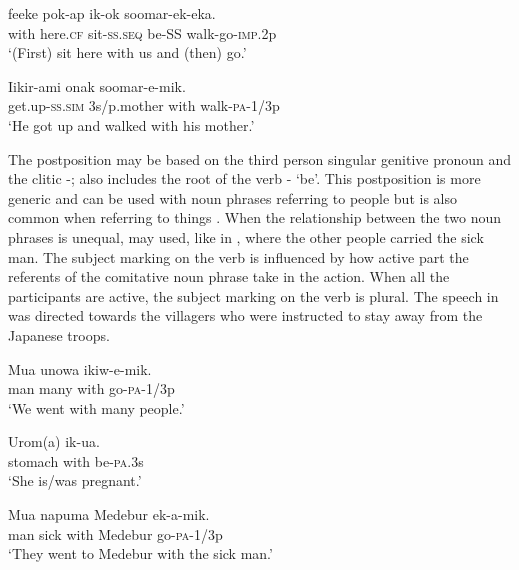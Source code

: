 \ea%
\label{ex:3:x822}
\gll {} feeke pok-ap ik-ok soomar-ek-eka. \\
with here.\textsc{cf} sit-\textsc{ss}.\textsc{seq} be-SS walk-go-\textsc{imp}.2p\\
\glt`(First) sit here with us and (then) go.'
\z

\ea%
\label{ex:3:x1817}
\gll Iikir-ami onak  soomar-e-mik. \\
get.up-\textsc{ss}.\textsc{sim} 3s/p.mother with walk-\textsc{pa}-1/3p\\
\glt`He got up and walked with his mother.'
\z

The postposition  may be based on the third person singular genitive pronoun  and the clitic -;  also includes the root of the verb \nobreakdash- `be'. This postposition is more generic and can be used with noun phrases referring to people  but is also common when referring to things . When the relationship between the two noun phrases is unequal,  may used, like in , where the other people carried the sick man. The subject marking on the verb is influenced by how active part the referents of the comitative noun phrase take in the action. When all the participants are active, the subject marking on the verb is plural. The speech in  was directed towards the villagers who were instructed to stay away from the Japanese troops. 

\ea%
\label{ex:3:x754}
\gll Mua unowa  ikiw-e-mik. \\
man many with go-\textsc{pa}-1/3p\\
\glt`We went with many people.'
\z

\ea%
\label{ex:3:x755}
\gll Urom(a)  ik-ua. \\
stomach with be-\textsc{pa}.3s\\
\glt`She is/was pregnant.'
\z

\ea%
\label{ex:3:x823}
\gll Mua napuma  Medebur ek-a-mik. \\
man sick with Medebur go-\textsc{pa}-1/3p\\
\glt`They went to Medebur with the sick man.'
\z

